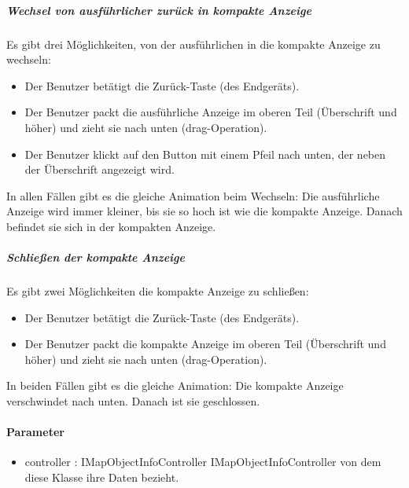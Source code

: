 \subparagraph*{Wechsel von ausführlicher zurück in kompakte Anzeige}
Es gibt drei Möglichkeiten, von der ausführlichen in die kompakte Anzeige zu wechseln:
\begin{itemize}
    \item Der Benutzer betätigt die Zurück-Taste (des Endgeräts).
    \item Der Benutzer packt die ausführliche Anzeige im oberen Teil (Überschrift und höher) und zieht sie nach unten (drag-Operation).
    \item Der Benutzer klickt auf den Button mit einem Pfeil nach unten, der neben der Überschrift angezeigt wird.
\end{itemize}
In allen Fällen gibt es die gleiche Animation beim Wechseln: Die ausführliche Anzeige wird immer 
kleiner, bis sie so hoch ist wie die kompakte Anzeige. Danach befindet sie sich in der kompakten Anzeige.

\subparagraph*{Schließen der kompakte Anzeige}
Es gibt zwei Möglichkeiten die kompakte Anzeige zu schließen:
\begin{itemize}
    \item Der Benutzer betätigt die Zurück-Taste (des Endgeräts).
    \item Der Benutzer packt die kompakte Anzeige im oberen Teil (Überschrift und höher) und zieht sie nach unten (drag-Operation). 
\end{itemize}
In beiden Fällen gibt es die gleiche Animation: Die kompakte Anzeige verschwindet nach unten. Danach ist sie geschlossen.

\paragraph*{Parameter}
\begin{itemize}
    \item controller : IMapObjectInfoController IMapObjectInfoController von dem diese Klasse ihre Daten bezieht.
\end{itemize}
